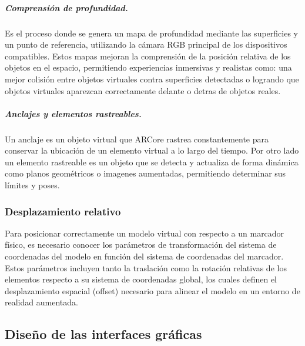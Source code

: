             \subparagraph{Comprensión de profundidad.}Es el proceso donde se genera un mapa de profundidad mediante las superficies y un punto de referencia, utilizando la cámara RGB principal de los dispositivos compatibles. Estos mapas mejoran la comprensión de la posición relativa de los objetos en el espacio, permitiendo experiencias inmersivas y realistas como: una mejor colisión entre objetos virtuales contra superficies detectadas o logrando que objetos virtuales aparezcan correctamente delante o detras de objetos reales. 

            \subparagraph{Anclajes y elementos rastreables.}Un anclaje es un objeto virtual que ARCore rastrea constantemente para conservar la ubicación de un elemento virtual a lo largo del tiempo. Por otro lado un elemento rastreable es un objeto que se detecta y actualiza de forma dinámica como planos geométricos o imagenes aumentadas, permitiendo determinar sus límites y poses.


        \subsubsection{Desplazamiento relativo}

            Para posicionar correctamente un modelo virtual con respecto a un marcador físico, es necesario conocer los parámetros de transformación del sistema de coordenadas del modelo en función del sistema de coordenadas del marcador. Estos parámetros incluyen tanto la traslación como la rotación relativas de los elementos respecto a su sistema de coordenadas global, los cuales definen el desplazamiento espacial (offset) necesario para alinear el modelo en un entorno de realidad aumentada.

    \subsection{Diseño de las interfaces gráficas}

